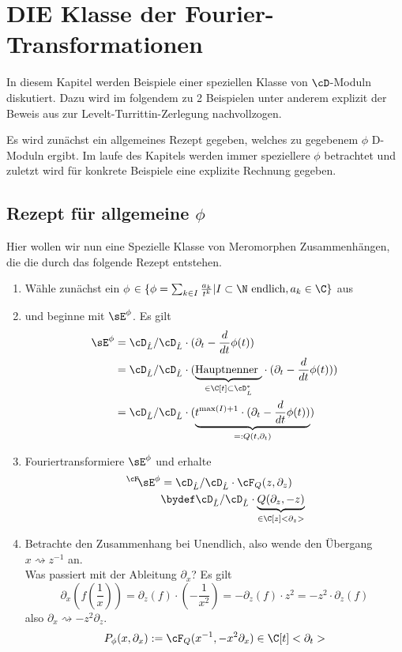 \chapter{DIE Klasse der Fourier-Transformationen}
In diesem Kapitel werden Beispiele einer speziellen Klasse von $\cD$-Moduln
diskutiert. Dazu wird im folgendem zu 2 Beispielen unter anderem explizit der
Beweis aus \cite{sabbah_cimpa90} zur Levelt-Turrittin-Zerlegung nachvollzogen.

Es wird zunächst ein allgemeines Rezept gegeben, welches zu gegebenem $\phi$
D-Moduln ergibt. Im laufe des Kapitels werden immer speziellere $\phi$
betrachtet und zuletzt wird für konkrete Beispiele eine explizite Rechnung
gegeben.

\section{Rezept für allgemeine $\phi$} \label{sec:allgemeinProblem}
Hier wollen wir nun eine Spezielle Klasse von Meromorphen Zusammenhängen, die
die durch das folgende Rezept entstehen.
\begin{enumerate}
\item Wähle zunächst ein $\phi$
$\in\{\phi=\sum_{k\in I}\frac{a_k}{t^{k}}|I\subset\N\mbox{ endlich}
,a_k\in \C\}$
aus
\item und beginne mit $\sE^{\phi}$. Es gilt
\begin{align*}
\sE^{\phi} &= \cD_{\hat L}/\cD_{\hat L}\cdot (\partial_t-\frac{d}{dt}\phi(t))
\\&=\cD_{\hat L}/\cD_{\hat L}\cdot (\underset{\in\C[t]\subset\cD_{\hat L}^*}
    {\underbrace{\mbox{Hauptnenner }}}
  \cdot (\partial_t-\frac{d}{dt}\phi(t)))
\\&=\cD_{\hat L}/\cD_{\hat L}\cdot ( \underset{=:Q(t,\partial_t)}{\underbrace{
  t^{\max(I)+1} \cdot (\partial_t-\frac{d}{dt}\phi(t))}})
\end{align*}
\begin{comment}
Dies ändert den Meromorphen Zusammenhang nicht, weil $t^{\max(I)+1}$ eine
Einheit in $\cD_{\hat L}$ (und auch in $\cD_{L}$) ist.
\end{comment}
\item Fouriertransformiere $\sE^{\phi}$ und erhalte
\begin{align*}
\,^\cF\!\sE^{\phi}&=\cD_{\hat L}/\cD_{\hat L}\cdot{\cF_Q(z,\partial_z)}
\\&\bydef \cD_{\hat L}/\cD_{\hat L}\cdot 
  \underset{\in\C[z]<\partial_z>}{\underbrace{Q(\partial_z,-z)}}
\end{align*}
\item Betrachte den Zusammenhang bei Unendlich, also wende den Übergang
$x\rightsquigarrow z^{-1}$ an.\\
Was passiert mit der Ableitung $\partial_x$?
Es gilt
\[
\partial_x (f(\frac{1}{x}))=
\partial_z(f)\cdot (-\frac{1}{x^2})=
-\partial_z(f)\cdot z^2= %
- z^2 \cdot \partial_z(f)
\]
also $ \partial_x\rightsquigarrow-z^2\partial_z $.
\[
P_\phi(x,\partial_x):=\cF_Q(x^{-1},-x^2\partial_x) \in \C[t]<\partial_t>
\]
\end{enumerate}
